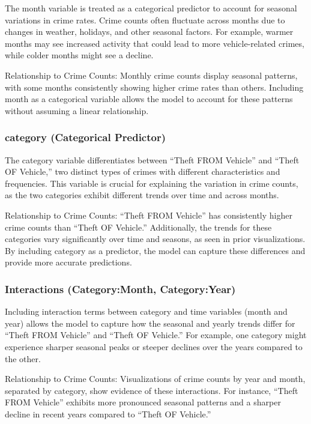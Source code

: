 \documentclass[
  letterpaper,
  DIV=11,
  numbers=noendperiod]{scrartcl}
\begin{document}
The month variable is treated as a categorical predictor to account for
seasonal variations in crime rates. Crime counts often fluctuate across
months due to changes in weather, holidays, and other seasonal factors.
For example, warmer months may see increased activity that could lead to
more vehicle-related crimes, while colder months might see a decline.

Relationship to Crime Counts: Monthly crime counts display seasonal
patterns, with some months consistently showing higher crime rates than
others. Including month as a categorical variable allows the model to
account for these patterns without assuming a linear relationship.

\subsubsection{category (Categorical
Predictor)}\label{category-categorical-predictor}

The category variable differentiates between ``Theft FROM Vehicle'' and
``Theft OF Vehicle,'' two distinct types of crimes with different
characteristics and frequencies. This variable is crucial for explaining
the variation in crime counts, as the two categories exhibit different
trends over time and across months.

Relationship to Crime Counts: ``Theft FROM Vehicle'' has consistently
higher crime counts than ``Theft OF Vehicle.'' Additionally, the trends
for these categories vary significantly over time and seasons, as seen
in prior visualizations. By including category as a predictor, the model
can capture these differences and provide more accurate predictions.

\subsubsection{Interactions (Category:Month,
Category:Year)}\label{interactions-categorymonth-categoryyear}

Including interaction terms between category and time variables (month
and year) allows the model to capture how the seasonal and yearly trends
differ for ``Theft FROM Vehicle'' and ``Theft OF Vehicle.'' For example,
one category might experience sharper seasonal peaks or steeper declines
over the years compared to the other.

Relationship to Crime Counts: Visualizations of crime counts by year and
month, separated by category, show evidence of these interactions. For
instance, ``Theft FROM Vehicle'' exhibits more pronounced seasonal
patterns and a sharper decline in recent years compared to ``Theft OF
Vehicle.''
\end{document}
